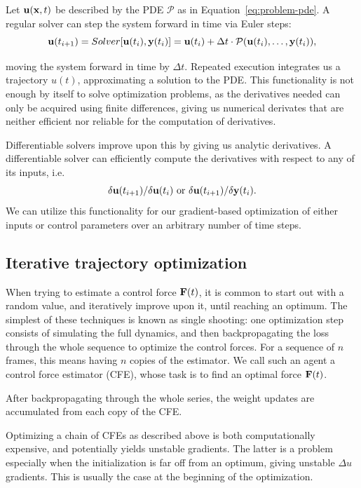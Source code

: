 \documentclass[acmtog]{techreportacmart}
\begin{document}
Let $\vb{u}(\vb{x}, t)$ be described by the PDE $\mathcal{P}$ as in
Equation~\eqref{eq:problem-pde}. A regular solver can step the system forward in
time via Euler steps:
\begin{equation}
  \vb{u}(t_{i+1}) = Solver[\vb{u}(t_i), \vb{y}(t_i)] =
  \vb{u}(t_i) + \Delta t \cdot \mathcal{P}(\vb{u}(t_i), \dots, \vb{y}(t_i)),
\end{equation}

moving the system forward in time by $\Delta t$. Repeated execution integrates
us a trajectory $u(t)$, approximating a solution to the PDE. This functionality
is not enough by itself to solve optimization problems, as the derivatives
needed can only be acquired using finite differences, giving us numerical
derivates that are neither efficient nor reliable for the computation of
derivatives. 

Differentiable solvers improve upon this by giving us analytic derivatives.
A differentiable solver can efficiently compute the derivatives with respect to
any of its inputs, i.e. 
\[
\delta \vb{u}(t_{i+1}) / \delta \vb{u}(t_i) 
\text{ or } 
\delta \vb{u}(t_{i+1}) / \delta \vb{y}(t_i). 
\]
We can utilize this functionality for our gradient-based optimization of either
inputs or control parameters over an arbitrary number of time steps. 

\subsection{Iterative trajectory optimization}
When trying to estimate a control force $\vb{F}(t)$, it is common to start out
with a random value, and iteratively improve upon it, until reaching an optimum.
The simplest of these techniques is known as single shooting: one optimization
step consists of simulating the full dynamics, and then backpropagating the loss
through the whole sequence to optimize the control forces. For a sequence of $n$
frames, this means having $n$ copies of the estimator. We call such an agent
a control force estimator (CFE), whose task is to find an optimal force
$\vb{F}(t)$.

After backpropagating through the whole series, the weight updates are
accumulated from each copy of the CFE. 

Optimizing a chain of CFEs as described above is both computationally expensive,
and potentially yields unstable gradients. The latter is a problem especially
when the initialization is far off from an optimum, giving unstable $\Delta u$
gradients. This is usually the case at the beginning of the optimization.
\end{document}
